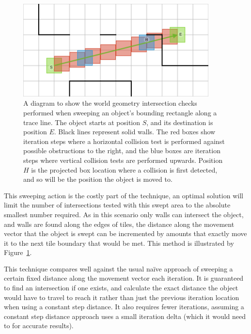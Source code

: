 \documentclass[12pt,a4paper]{article}
\begin{document}
\begin{figure}[h]
\centering
\includegraphics[width=0.9\textwidth]{trace}
\caption{A diagram to show the world geometry intersection checks performed when sweeping an object's bounding rectangle along a trace line. The object starts at position $S$, and its destination is position $E$. Black lines represent solid walls. The red boxes show iteration steps where a horizontal collision test is performed against possible obstructions to the right, and the blue boxes are iteration steps where vertical collision tests are performed upwards. Position $H$ is the projected box location where a collision is first detected, and so will be the position the object is moved to.}
\label{fig:trace}
\end{figure}

This sweeping action is the costly part of the technique, an optimal solution will limit the number of intersections tested with this swept area to the absolute smallest number required. As in this scenario only walls can intersect the object, and walls are found along the edges of tiles, the distance along the movement vector that the object is swept can be incremented by amounts that exactly move it to the next tile boundary that would be met. This method is illustrated by Figure~\ref{fig:trace}.

This technique compares well against the usual na\"{i}ve approach of sweeping a certain fixed distance along the movement vector each iteration. It is guaranteed to find an intersection if one exists, and calculate the exact distance the object would have to travel to reach it rather than just the previous iteration location when using a constant step distance. It also requires fewer iterations, assuming a constant step distance approach uses a small iteration delta (which it would need to for accurate results).
\end{document}
